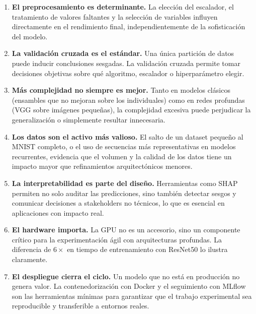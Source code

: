 \documentclass[12pt, a4paper]{article}
\begin{document}
\begin{enumerate}[leftmargin=*, label=\textbf{\arabic*.}]

  \item \textbf{El preprocesamiento es determinante.} La elección del escalador, el tratamiento de valores faltantes y la selección de variables influyen directamente en el rendimiento final, independientemente de la sofisticación del modelo.

  \item \textbf{La validación cruzada es el estándar.} Una única partición de datos puede inducir conclusiones sesgadas. La validación cruzada permite tomar decisiones objetivas sobre qué algoritmo, escalador o hiperparámetro elegir.

  \item \textbf{Más complejidad no siempre es mejor.} Tanto en modelos clásicos (ensambles que no mejoran sobre los individuales) como en redes profundas (VGG sobre imágenes pequeñas), la complejidad excesiva puede perjudicar la generalización o simplemente resultar innecesaria.

  \item \textbf{Los datos son el activo más valioso.} El salto de un dataset pequeño al MNIST completo, o el uso de secuencias más representativas en modelos recurrentes, evidencia que el volumen y la calidad de los datos tiene un impacto mayor que refinamientos arquitectónicos menores.

  \item \textbf{La interpretabilidad es parte del diseño.} Herramientas como SHAP permiten no solo auditar las predicciones, sino también detectar sesgos y comunicar decisiones a stakeholders no técnicos, lo que es esencial en aplicaciones con impacto real.

  \item \textbf{El hardware importa.} La GPU no es un accesorio, sino un componente crítico para la experimentación ágil con arquitecturas profundas. La diferencia de $6\times$ en tiempo de entrenamiento con ResNet50 lo ilustra claramente.

  \item \textbf{El despliegue cierra el ciclo.} Un modelo que no está en producción no genera valor. La contenedorización con Docker y el seguimiento con MLflow son las herramientas mínimas para garantizar que el trabajo experimental sea reproducible y transferible a entornos reales.

\end{enumerate}
\end{document}
